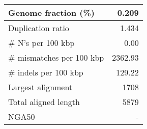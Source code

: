 \documentclass[12pt,a4paper]{article}
\begin{document}
\begin{table}[ht]
\begin{center}
\begin{tabular}{|l*{1}{|r}|}
Genome fraction (\%) & 0.209 \\ \hline
Duplication ratio & 1.434 \\ \hline
\# N's per 100 kbp & 0.00 \\ \hline
\# mismatches per 100 kbp & 2362.93 \\ \hline
\# indels per 100 kbp & 129.22 \\ \hline
Largest alignment & 1708 \\ \hline
Total aligned length & 5879 \\ \hline
NGA50 & - \\ \hline
\end{tabular}
\end{center}
\end{table}
\end{document}

